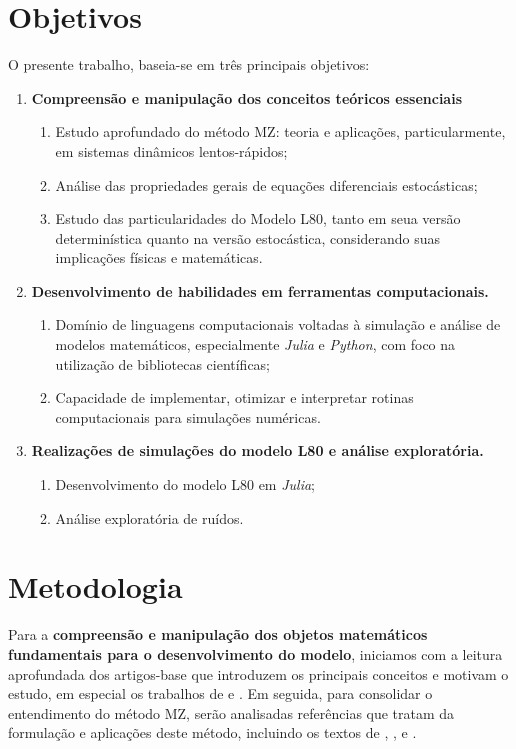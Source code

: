 \documentclass[12pt]{article}
\begin{document}
\section*{Objetivos}
O presente trabalho, baseia-se em três principais objetivos:
\begin{enumerate}
	\item \textbf{Compreensão e manipulação dos conceitos teóricos essenciais}
	      \begin{enumerate}
	      	\item Estudo aprofundado do método MZ: teoria e aplicações, particularmente, em sistemas dinâmicos lentos-rápidos;
	      	\item Análise das propriedades gerais de equações diferenciais estocásticas;
	      	\item Estudo das particularidades do Modelo L80, tanto em seua versão determinística quanto na versão estocástica, considerando suas implicações físicas e matemáticas.
	      \end{enumerate}
	      
	\item \textbf{Desenvolvimento de habilidades em ferramentas computacionais.}
	      \begin{enumerate}
	      	\item Domínio de linguagens computacionais voltadas à simulação e análise de modelos matemáticos, especialmente \textit{Julia} e \textit{Python}, com foco na utilização de bibliotecas científicas;
	      	\item Capacidade de implementar, otimizar e interpretar rotinas computacionais para simulações numéricas.
	      \end{enumerate}
	      
	\item \textbf{Realizações de simulações do modelo L80 e análise exploratória.}
	      \begin{enumerate}
	      	\item Desenvolvimento do modelo L80 em \textit{Julia};
	      	\item Análise exploratória de ruídos.
	      \end{enumerate}
\end{enumerate}


\section*{Metodologia}
Para a \textbf{compreensão e manipulação dos objetos matemáticos fundamentais para o desenvolvimento do modelo}, iniciamos com a leitura aprofundada dos artigos-base que introduzem os principais conceitos e motivam o estudo, em especial os trabalhos de \citet{Chekroun2017} e \citet{Chekroun2021}. Em seguida, para consolidar o entendimento do método MZ, serão analisadas referências que tratam da formulação e aplicações deste método, incluindo os textos de \citet{Gouasmi2017}, \citet{Chorin2000}, \citet{Chorin2002} e \citet{Chorin2013}.
\end{document}
